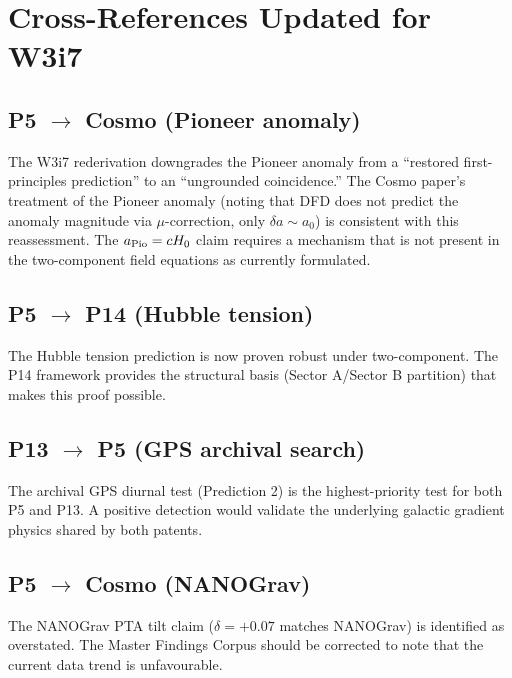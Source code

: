 \documentclass[11pt]{article}
\newcommand{\Hzero}{H_0}
\begin{document}
\newpage

\section{Cross-References Updated for W3i7}
\label{sec:xrefs}

\subsection{P5 $\to$ Cosmo (Pioneer anomaly)}

The W3i7 rederivation downgrades the Pioneer anomaly from a
``restored first-principles prediction'' to an ``ungrounded coincidence.''
The Cosmo paper's treatment of the Pioneer anomaly (noting that
DFD does not predict the anomaly magnitude via $\mu$-correction, only
$\delta a \sim a_0$) is consistent with this reassessment. The
$a_{\rm Pio} = c\Hzero$ claim requires a mechanism that is not present
in the two-component field equations as currently formulated.

\subsection{P5 $\to$ P14 (Hubble tension)}

The Hubble tension prediction is now proven robust under two-component.
The P14 framework provides the structural basis (Sector A/Sector B
partition) that makes this proof possible.

\subsection{P13 $\to$ P5 (GPS archival search)}

The archival GPS diurnal test (Prediction 2) is the highest-priority
test for both P5 and P13. A positive detection would validate the
underlying galactic gradient physics shared by both patents.

\subsection{P5 $\to$ Cosmo (NANOGrav)}

The NANOGrav PTA tilt claim ($\delta = +0.07$ matches NANOGrav) is
identified as overstated. The Master Findings Corpus should be
corrected to note that the current data trend is unfavourable.
\end{document}
